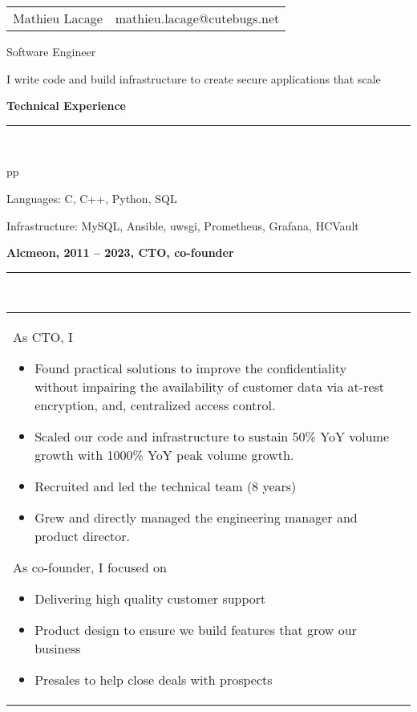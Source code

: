 \documentclass[a4paper,12pt]{article}
\newcommand{\ligne}[1]{\rule[0.5ex]{\textwidth}{#1}\\}
\newcommand{\styleRub}[1]{\textbf{\large #1}\par}
\newcommand{\indentStd}{\noindent\hspace*{10pt}}
\newenvironment{rubrique}[2][\linewidth]%
{\styleRub{#2}%
\ligne{0.5mm}
\setlength{\lenB}{#1}%
\setlength{\lenC}{\linewidth}%
\addtolength{\lenC}{-\lenA}%
\addtolength{\lenC}{-\lenB}%
\addtolength{\lenC}{-19pt}
\indentStd\begin{tabular}[t]{p{\lenB}p{\lenC}}}
{\end{tabular}}
\newlength{\lenA} %
\newlength{\lenB} %
\newlength{\lenC} %
\begin{document}
\begin{tabular*}{1\textwidth}{@{\extracolsep{\fill}}lr}
Mathieu Lacage & mathieu.lacage@cutebugs.net\\
\end{tabular*}

\vspace{1cm}
\begin{center}{\huge Software Engineer}\end{center}

\begin{center}
I write code and build infrastructure to create
secure applications that scale
\end{center}

\vspace{1cm}
\begin{rubrique}{Technical Experience}

Languages: C, C++, Python, SQL

Infrastructure: MySQL, Ansible, uwsgi, Prometheus, Grafana, HCVault

\end{rubrique}

\begin{rubrique}{Alcmeon, 2011 -- 2023, CTO, co-founder}

As CTO, I 
\begin{itemize}
\item Found practical solutions to improve the confidentiality 
        without impairing the availability of customer data via 
        at-rest encryption, and, centralized access control.
\item Scaled our code and infrastructure to sustain
        50\% YoY volume growth with 1000\% YoY peak volume growth.
\item Recruited and led the technical team (8 years)
\item Grew and directly managed the engineering manager and product
        director.
\end{itemize}


As co-founder, I focused on
\begin{itemize}
\item Delivering high quality customer support
\item Product design to ensure we build features that grow our business
\item Presales to help close deals with prospects
\end{itemize}

\end{rubrique}
\end{document}
